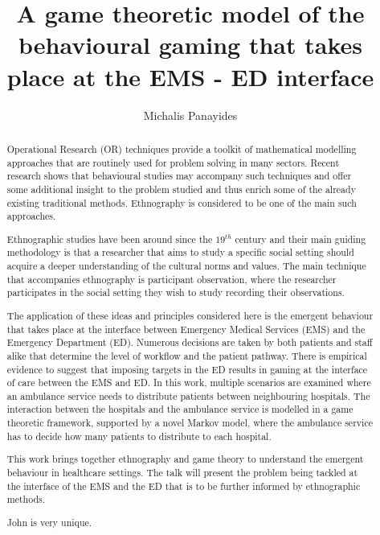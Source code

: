 \documentclass{article}
\title{A game theoretic model of the behavioural gaming that takes place at the EMS
 - ED interface}
\author{Michalis Panayides}
\begin{document}
\maketitle
\begin{abstract}
    Operational Research (OR) techniques provide a toolkit of mathematical 
    modelling approaches that are routinely used for problem solving in many
    sectors. Recent research shows that behavioural studies may accompany such
    techniques and offer some additional insight to the problem studied and 
    thus enrich some of the already existing traditional methods. Ethnography is 
    considered to be one of the main such approaches.

    Ethnographic studies have been around since the \(19^{th}\) century and
    their main guiding methodology is that a researcher that aims to study 
    a specific social setting should acquire a deeper understanding of the 
    cultural norms and values. The main technique that accompanies ethnography 
    is participant observation, where the researcher participates in the social 
    setting they wish to study recording their observations.

    The application of these ideas and principles considered here is the emergent 
    behaviour that takes place at the interface between Emergency Medical Services 
    (EMS) and the Emergency Department (ED). Numerous decisions are taken by both 
    patients and staff alike that determine the level of workflow and the patient 
    pathway. There is empirical evidence to suggest that imposing targets in the ED 
    results in gaming at the interface of care between the EMS and ED. In this work,
    multiple scenarios are examined where an ambulance service needs to distribute 
    patients between neighbouring hospitals. The interaction between the hospitals 
    and the ambulance service is modelled in a game theoretic framework, supported by 
    a novel Markov model, where the ambulance service has to decide how many patients 
    to distribute to each hospital.

    This work brings together ethnography and game theory to understand the emergent
    behaviour in healthcare settings. The talk will present the problem being tackled
    at the interface of the EMS and the ED that is to be further informed by ethnographic methods.
        
    John is very unique. 
\end{abstract}
    
\end{document}
